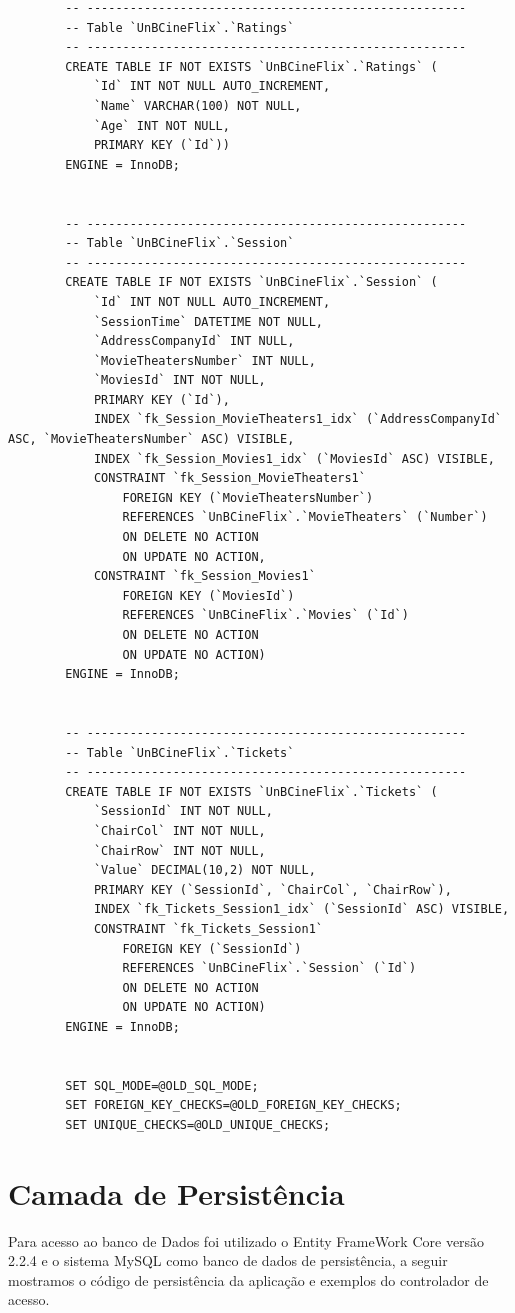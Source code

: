 \documentclass[a4paper,10pt]{article}
\begin{document}
\begin{lstlisting}
		-- -----------------------------------------------------
		-- Table `UnBCineFlix`.`Ratings`
		-- -----------------------------------------------------
		CREATE TABLE IF NOT EXISTS `UnBCineFlix`.`Ratings` (
			`Id` INT NOT NULL AUTO_INCREMENT,
			`Name` VARCHAR(100) NOT NULL,
			`Age` INT NOT NULL,
			PRIMARY KEY (`Id`))
		ENGINE = InnoDB;


		-- -----------------------------------------------------
		-- Table `UnBCineFlix`.`Session`
		-- -----------------------------------------------------
		CREATE TABLE IF NOT EXISTS `UnBCineFlix`.`Session` (
			`Id` INT NOT NULL AUTO_INCREMENT,
			`SessionTime` DATETIME NOT NULL,
			`AddressCompanyId` INT NULL,
			`MovieTheatersNumber` INT NULL,
			`MoviesId` INT NOT NULL,
			PRIMARY KEY (`Id`),
			INDEX `fk_Session_MovieTheaters1_idx` (`AddressCompanyId` ASC, `MovieTheatersNumber` ASC) VISIBLE,
			INDEX `fk_Session_Movies1_idx` (`MoviesId` ASC) VISIBLE,
			CONSTRAINT `fk_Session_MovieTheaters1`
				FOREIGN KEY (`MovieTheatersNumber`)
				REFERENCES `UnBCineFlix`.`MovieTheaters` (`Number`)
				ON DELETE NO ACTION
				ON UPDATE NO ACTION,
			CONSTRAINT `fk_Session_Movies1`
				FOREIGN KEY (`MoviesId`)
				REFERENCES `UnBCineFlix`.`Movies` (`Id`)
				ON DELETE NO ACTION
				ON UPDATE NO ACTION)
		ENGINE = InnoDB;


		-- -----------------------------------------------------
		-- Table `UnBCineFlix`.`Tickets`
		-- -----------------------------------------------------
		CREATE TABLE IF NOT EXISTS `UnBCineFlix`.`Tickets` (
			`SessionId` INT NOT NULL,
			`ChairCol` INT NOT NULL,
			`ChairRow` INT NOT NULL,
			`Value` DECIMAL(10,2) NOT NULL,
			PRIMARY KEY (`SessionId`, `ChairCol`, `ChairRow`),
			INDEX `fk_Tickets_Session1_idx` (`SessionId` ASC) VISIBLE,
			CONSTRAINT `fk_Tickets_Session1`
				FOREIGN KEY (`SessionId`)
				REFERENCES `UnBCineFlix`.`Session` (`Id`)
				ON DELETE NO ACTION
				ON UPDATE NO ACTION)
		ENGINE = InnoDB;


		SET SQL_MODE=@OLD_SQL_MODE;
		SET FOREIGN_KEY_CHECKS=@OLD_FOREIGN_KEY_CHECKS;
		SET UNIQUE_CHECKS=@OLD_UNIQUE_CHECKS;
\end{lstlisting}


\section{Camada de Persistência}

Para acesso ao banco de Dados foi utilizado o Entity FrameWork Core versão 2.2.4 e o sistema MySQL como banco de dados de persistência, a seguir mostramos o código de persistência da aplicação e exemplos do controlador de acesso. 
\end{document}
